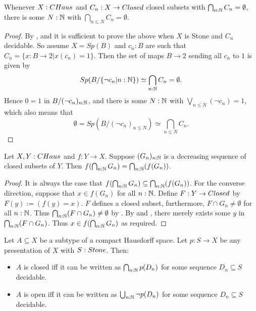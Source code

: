 \begin{lemma}\label{CHausFiniteIntersectionProperty}
  Whenever $X:\Chaus$ and $C_n:X\to \Closed$ closed subsets with $\bigcap_{n:\mathbb{N}} C_n =\emptyset$, there is some $N:\mathbb{N}$ 
  with $\bigcap_{n\leq N} C_n  = \emptyset$. 
\end{lemma}
\begin{proof}
  By , and  
  it is sufficient to prove the above when $X$ is Stone and $C_n$ decidable.
  So assume 
  $X=Sp(B)$ and $c_n:B$ are such that $C_n = \{x:B\to 2 | x(c_n) = 1\}$. 
  Then the set of maps $B\to 2$ sending all $c_n$ to $1$ is given by 
  $$Sp(B/\{\neg c_n |n:\mathbb{N}\}) \simeq \bigcap_{n:\mathbb{N}} C_n = \emptyset .$$
  Hence 
  $0=1$ in $B/(\neg c_n)_{n:\mathbb{N}}$, 
  and there is some $N:\mathbb{N}$ with 
  $\bigvee_{n\leq N} (\neg c_n) = 1$, which also means that 
  $$\emptyset = Sp(B/(\neg c_n)_{n \leq N})  \simeq \bigcap_{n\leq N} C_n .$$
\end{proof}
\begin{corollary}\label{ChausMapsPreserveIntersectionOfClosed}
  Let $X,Y:\CHaus$ and $f:Y \to X$. 
  Suppose $(G_n)_{n:\mathbb{N}}$ is a decreasing sequence of closed subsets of $Y$. 
  Then $f(\bigcap_{n:\mathbb{N}} G_n) = \bigcap_{n:\mathbb{N}}(f(G_n))$. 
\end{corollary}
\begin{proof}
  It is always the case that $f(\bigcap_{n:\mathbb{N}} G_n) \subseteq \bigcap_{n:\mathbb{N}} (f(G_n))$. 
  For the converse direction, suppose that $x \in f(G_n)$ for all $n:\mathbb{N}$. 
  Define $F: Y \to \Closed$ by $F(y) := \left(f(y) = x\right)$. 
  $F$ defines a closed subset, furthermore, $F\cap G_n \neq \emptyset$ for all $n:\mathbb{N}$. 
  Thus $\bigcap_{n:\mathbb{N}}(F\cap G_n) \neq \emptyset$ by . 
  By  and , there merely exists some 
  $y$ in $\bigcap_{n:\mathbb{N}} (F\cap G_n)$. Thus $x\in f(\bigcap_{n:\mathbb{N}} G_n)$ as required. 
\end{proof}
\begin{corollary}\label{CompactHausdorffTopology}
Let $A\subseteq X$ be a subtype of a compact Hausdorff space. 
Let $p:S\to X$ be any presentation of $X$ with $S:\Stone$. Then:
\begin{itemize}
  \item $A$ is closed iff it can be written as $\bigcap_{n:\mathbb{N}} p(D_n)$
for some sequence $D_n\subseteq S$ decidable. 
  \item $A$ is open iff it can be written as $\bigcup_{n:\mathbb{N}} \neg p(D_n)$
for some sequence $D_n\subseteq S$ decidable.
\end{itemize}  
\end{corollary}
